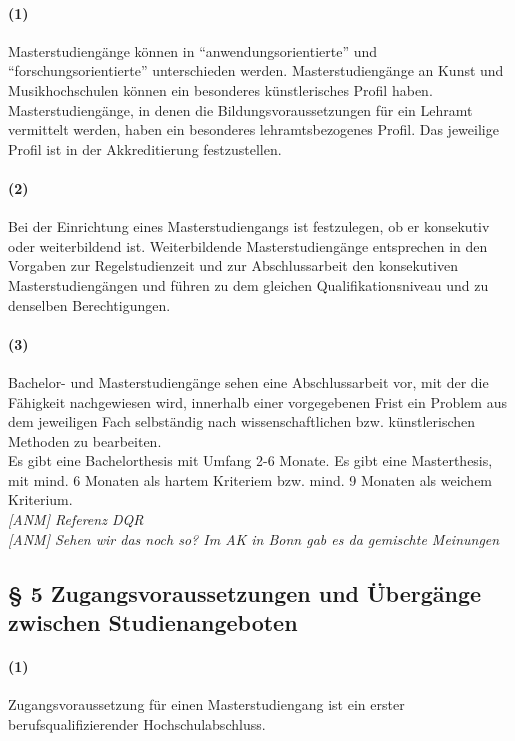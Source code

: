 \documentclass[a4paper]{scrartcl}
\begin{document}
\paragraph{(1)} Masterstudiengänge können in \enquote{anwendungsorientierte} und \enquote{forschungsorientierte} unterschieden werden. Masterstudiengänge an Kunst und Musikhochschulen können ein besonderes künstlerisches Profil haben. Masterstudiengänge, in denen die Bildungsvoraussetzungen für ein Lehramt vermittelt werden, haben ein besonderes lehramtsbezogenes Profil. Das jeweilige Profil ist in der Akkreditierung festzustellen.

\paragraph{(2)} Bei der Einrichtung eines Masterstudiengangs ist festzulegen, ob er konsekutiv oder weiterbildend ist. Weiterbildende Masterstudiengänge entsprechen in den Vorgaben zur Regelstudienzeit und zur Abschlussarbeit den konsekutiven Masterstudiengängen und führen zu dem gleichen Qualifikationsniveau und zu denselben Berechtigungen.

\paragraph{(3)} Bachelor- und Masterstudiengänge sehen eine Abschlussarbeit vor, mit der die Fähigkeit nachgewiesen wird, innerhalb einer vorgegebenen Frist ein Problem aus dem jeweiligen Fach selbständig nach wissenschaftlichen bzw. künstlerischen Methoden zu bearbeiten.\\


\textcolor{Bernd}{\textbf{\cite{RESO: SoSe2002-RL}} Es gibt eine Bachelorthesis mit Umfang 2-6 Monate. Es gibt eine Masterthesis, mit mind. 6 Monaten als hartem Kriteriem bzw. mind. 9 Monaten als weichem Kriterium.}\\ %

\textcolor{Brutus}{\emph{[ANM] Referenz DQR}}\\

\textcolor{Brutus}{\emph{[ANM] Sehen wir das noch so? Im AK in Bonn gab es da gemischte Meinungen}}


\subsection{§ 5 Zugangsvoraussetzungen und Übergänge zwischen Studienangeboten}
\paragraph{(1)} Zugangsvoraussetzung für einen Masterstudiengang ist ein erster berufsqualifizierender Hochschulabschluss.\\
\end{document}
